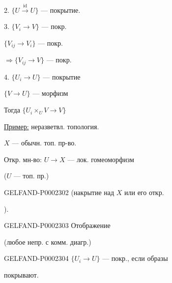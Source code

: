 2. $\{U\overset{\mathrm{id}}{\longrightarrow}U\}$ — покрытие.



3. $\{V_i\to V\}$ — покр.

$\{V_{ij}\to V_i\}$ — покр.

$\Rightarrow\{V_{ij}\to V\}$ — покр.



4. $\{U_i\to U\}$ — покрытие

$\{V\to U\}$ — морфизм

Тогда $\{U_i\times_U V\to V\}$



\underline{Пример:} неразветвл. топология.

$X$ — обычн. топ. пр-во.



Откр. мн-во: $U\to X$ — лок. гомеоморфизм

($U$ — топ. пр.)



\begin{GelfandAdjacentEvidence}{GELFAND-P000230}{2}
(накрытие над $X$ или его откр. 

).
\end{GelfandAdjacentEvidence}

\begin{GelfandAdjacentEvidence}{GELFAND-P000230}{3}
Отображение




\end{GelfandAdjacentEvidence}

(любое непр. с комм. диагр.)



\begin{GelfandAdjacentEvidence}{GELFAND-P000230}{4}
$\{U_i\to U\}$ — покр., если образы


покрывают.
\end{GelfandAdjacentEvidence}



